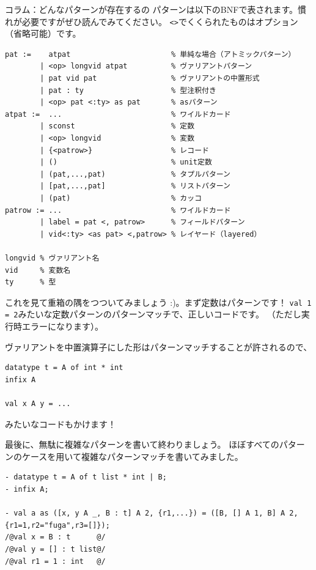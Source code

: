 \documentclass[11pt,a4paper]{article}
\begin{document}
\begin{itembox}[l]{コラム：どんなパターンが存在するの}
  パターンは以下のBNFで表されます。慣れが必要ですがぜひ読んでみてください。
  \lstinline{<>}でくくられたものはオプション（省略可能）です。
\begin{Verbatim}
pat :=    atpat                       % 単純な場合（アトミックパターン）
        | <op> longvid atpat          % ヴァリアントパターン
        | pat vid pat                 % ヴァリアントの中置形式
        | pat : ty                    % 型注釈付き
        | <op> pat <:ty> as pat       % asパターン
atpat :=  ...                         % ワイルドカード
        | sconst                      % 定数
        | <op> longvid                % 変数
        | {<patrow>}                  % レコード
        | ()                          % unit定数
        | (pat,...,pat)               % タプルパターン
        | [pat,...,pat]               % リストパターン
        | (pat)                       % カッコ
patrow := ...                         % ワイルドカード
        | label = pat <, patrow>      % フィールドパターン
        | vid<:ty> <as pat> <,patrow> % レイヤード（layered）

longvid % ヴァリアント名
vid     % 変数名
ty      % 型
\end{Verbatim}

これを見て重箱の隅をつついてみましょう :)。まず定数はパターンです！
\lstinline{val 1 = 2}みたいな定数パターンのパターンマッチで、正しいコードです。
（ただし実行時エラーになります）。

ヴァリアントを中置演算子にした形はパターンマッチすることが許されるので、
\begin{lstlisting}[caption=中置形式のヴァリアントのパターンマッチ]
datatype t = A of int * int
infix A

val x A y = ...
\end{lstlisting}
みたいなコードもかけます！

最後に、無駄に複雑なパターンを書いて終わりましょう。
ほぼすべてのパターンのケースを用いて複雑なパターンマッチを書いてみました。
\begin{lstlisting}[caption=複雑なパターン]
- datatype t = A of t list * int | B;
- infix A;

- val a as ([x, y A _, B : t] A 2, {r1,...}) = ([B, [] A 1, B] A 2, {r1=1,r2="fuga",r3=[]});
/@val x = B : t      @/
/@val y = [] : t list@/
/@val r1 = 1 : int   @/

\end{lstlisting}
\end{itembox}
\end{document}

